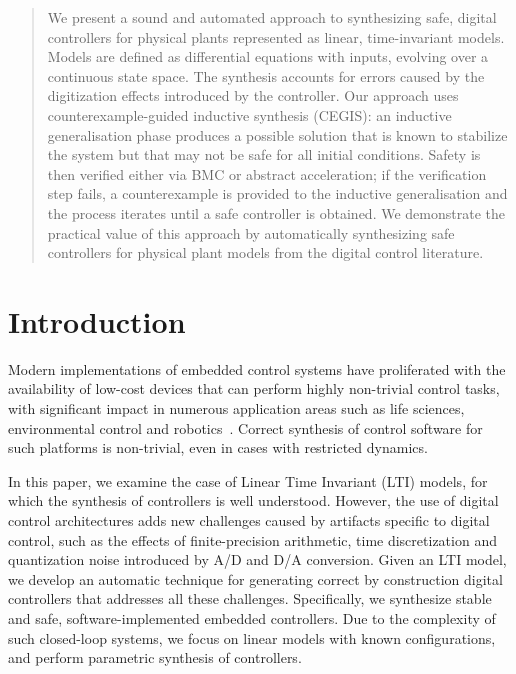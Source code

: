 \documentclass[twocolumn]{autart}    %
\begin{document}
\begin{frontmatter}


\begin{abstract}                          %
We present a sound and automated approach to synthesizing safe,
digital controllers for physical plants represented as linear,
time-invariant models. Models are defined as differential equations
with inputs, evolving over a continuous state space. The synthesis
accounts for errors caused by the digitization effects introduced by
the controller. Our approach uses counterexample-guided inductive
synthesis (CEGIS): an inductive generalisation phase produces a
possible solution that is known to stabilize the system but that may
not be safe for all initial conditions. Safety is then verified either
via BMC or abstract acceleration; if the verification step fails, a
counterexample is provided to the inductive generalisation and the
process iterates until a safe controller is obtained.  We demonstrate
the practical value of this approach by automatically synthesizing
safe controllers for physical plant models from the digital control
literature.
\end{abstract}

\end{frontmatter}

\section{Introduction}

Modern implementations of embedded control systems have proliferated
with the availability of low-cost devices that can perform highly
non-trivial control tasks, with significant impact in numerous
application areas such as life sciences, environmental control and
robotics~\cite{astrom1997computer, Franklin15}.  Correct synthesis of
control software for such platforms is non-trivial, even in cases with
restricted dynamics.

In this paper, we examine the case of Linear Time Invariant (LTI)
models, for which the synthesis of controllers is well understood.
However, the use of digital control architectures adds new challenges
caused by artifacts specific to digital control, such as the effects
of finite-precision arithmetic, time discretization and quantization
noise introduced by A/D and D/A conversion.
%
Given an LTI model, we develop an automatic technique for generating
correct by construction digital controllers that addresses all these
challenges. Specifically, we synthesize stable and safe,
software-implemented embedded controllers.  Due to the complexity of
such closed-loop systems, we focus on linear models with known
configurations, and perform parametric synthesis of controllers.
\end{document}

